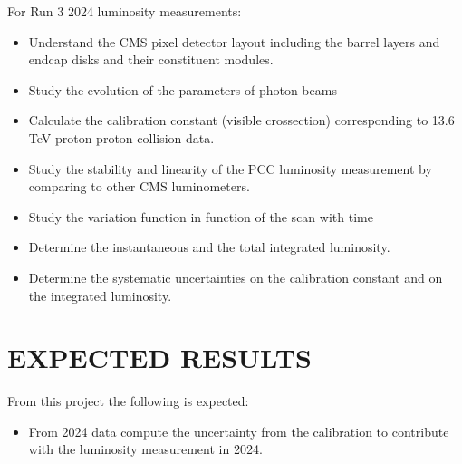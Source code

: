 \documentclass[final,12p]{article}
\begin{document}
For Run 3 2024 luminosity measurements:
\begin{itemize}
\item Understand the CMS pixel detector layout including the barrel layers and endcap disks and their constituent modules.
\item Study the evolution of the parameters of photon beams
\item Calculate the calibration constant (visible crossection) corresponding to 13.6 TeV proton-proton collision data.
\item Study the stability and linearity of the PCC luminosity measurement by comparing to other CMS luminometers.
\item Study the variation function in function of the scan with time
\item Determine the instantaneous and the total integrated luminosity.
\item Determine the systematic uncertainties on the calibration constant and on the integrated luminosity.
\end{itemize}

\par



\newpage
\section{EXPECTED RESULTS}

From this project the following is expected:
\begin{itemize}
\item From 2024 data compute the uncertainty from the calibration to contribute with the luminosity measurement in 2024.  
\end{itemize}
\end{document}
